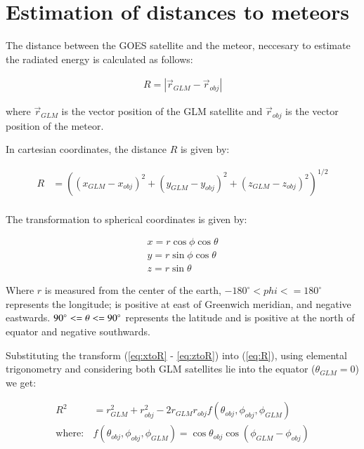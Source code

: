 \appendix


\section{Estimation of distances to meteors}
\label{app:distance}
The distance between the GOES satellite and the meteor, neccesary to estimate the radiated energy is calculated as follows:

\begin{align}
  R = \left|\vec{r}_{GLM} - \vec{r}_{obj} \right|
\end{align}

where $\vec{r}_{GLM}$ is the vector position of the GLM satellite and $\vec{r}_{obj}$ is the vector position of the meteor.

In cartesian coordinates, the distance $R$ is given by:

\begin{align}
  R &= \left((x_{GLM}-x_{obj})^2 + (y_{GLM}-y_{obj})^2 + (z_{GLM}-z_{obj})^2\right)^{1/2} \label{eq:R}\\
\end{align}

The transformation to spherical coordinates is given by:

\begin{align}
  x = r\cos\phi\cos\theta \label{eq:xtoR}\\
  y = r\sin\phi\cos\theta \label{eq:ytoR}\\
  z = r\sin\theta \label{eq:ztoR}
\end{align}

Where $r$ is measured from the center of the earth, $ -180^\circ < phi <= 180^\circ$ represents the longitude; is positive at east of Greenwich meridian, and negative eastwards. $\-90^\circ <= \theta <= 90^\circ$ represents the latitude and is positive at the north of equator and negative southwards.

Substituting the transform (\ref{eq:xtoR} - \ref{eq:ztoR}) into (\ref{eq:R}), using elemental trigonometry and considering both GLM satellites lie into the equator ($\theta_{GLM}=0$) we get:

\begin{align}
  R^2 &= r_{GLM}^2 + r_{obj}^2 - 2r_{GLM}r_{obj}f(\theta_{obj}, \phi_{obj}, \phi_{GLM}) \label{eq:R2}\\
  \mathrm{where:} & f(\theta_{obj}, \phi_{obj}, \phi_{GLM}) = \cos\theta_{obj}\cos\left(\phi_{GLM}-\phi_{obj}\right)
\end{align}

